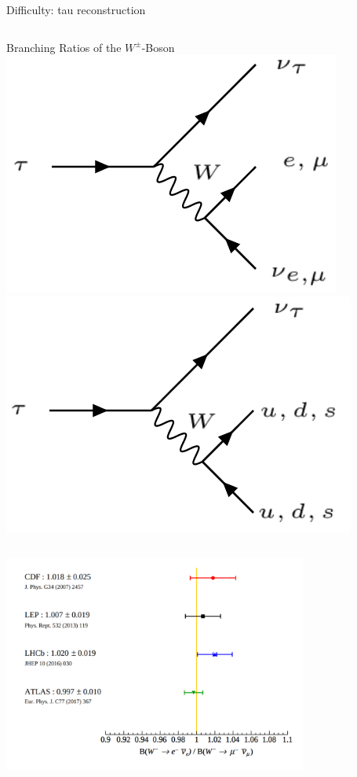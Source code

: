 \begin{frame}{Difficulty: tau reconstruction}
\begin{columns}
            \begin{column}{0.55\textwidth}{Branching Ratios of the $W^{\pm}$-Boson}
                \includegraphics[scale=0.3]{content/feynman/png/tau_lep.png}
                \includegraphics[scale=0.3]{content/feynman/png/tau_had.png}
            \end{column}
    
        \end{columns}
    \end{frame}

    \begin{frame}
        \includegraphics[width=0.75\textwidth]{content/images/BR_W.png}
    \end{frame}

